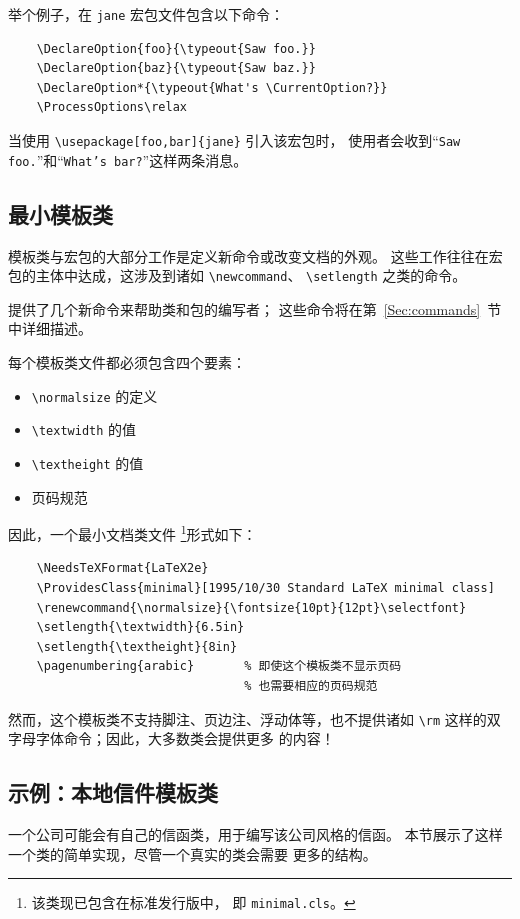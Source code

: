 \documentclass{ltxguide}[1995/11/28]
\begin{document}
举个例子，在 \verb|jane| 宏包文件包含以下命令：
\begin{verbatim}
	\DeclareOption{foo}{\typeout{Saw foo.}}
	\DeclareOption{baz}{\typeout{Saw baz.}}
	\DeclareOption*{\typeout{What's \CurrentOption?}}
	\ProcessOptions\relax
\end{verbatim}
当使用 \verb|\usepackage[foo,bar]{jane}| 引入该宏包时，
使用者会收到“\texttt{Saw foo.}”和“\texttt{What's bar?}”这样两条消息。

\subsection{最小模板类}

模板类与宏包的大部分工作是定义新命令或改变文档的外观。
这些工作往往在宏包的主体中达成，这涉及到诸如 \verb|\newcommand|、
\verb|\setlength| 之类的命令。

\LaTeXe{} 提供了几个新命令来帮助类和包的编写者；
这些命令将在第~\ref{Sec:commands}~节中详细描述。

每个模板类文件都必须包含四个要素：
\begin{itemize}
	\item \verb|\normalsize| 的定义
	\item \verb|\textwidth|  的值
	\item \verb|\textheight| 的值
	\item 页码规范
\end{itemize}
因此，一个最小文档类文件 \footnote{该类现已包含在标准发行版中，
即 \texttt{minimal.cls}。}形式如下：
\begin{verbatim}
	\NeedsTeXFormat{LaTeX2e}
	\ProvidesClass{minimal}[1995/10/30 Standard LaTeX minimal class]
	\renewcommand{\normalsize}{\fontsize{10pt}{12pt}\selectfont}
	\setlength{\textwidth}{6.5in}
	\setlength{\textheight}{8in}
	\pagenumbering{arabic}       % 即使这个模板类不显示页码
	                             % 也需要相应的页码规范
\end{verbatim}
然而，这个模板类不支持脚注、页边注、浮动体等，也不提供诸如
\verb|\rm| 这样的双字母字体命令；因此，大多数类会提供更多
的内容！

\subsection{示例：本地信件模板类}

一个公司可能会有自己的信函类，用于编写该公司风格的信函。
本节展示了这样一个类的简单实现，尽管一个真实的类会需要
更多的结构。
\end{document}
